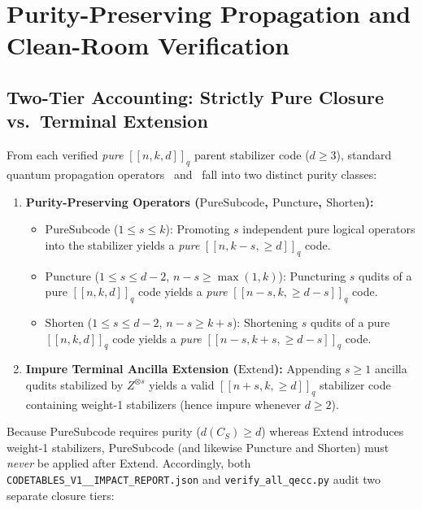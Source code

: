 \documentclass[11pt,a4paper]{article}
\theoremstyle{remark}
\begin{document}
\section{Purity-Preserving Propagation and Clean-Room Verification}\label{sec:verification}

\subsection{Two-Tier Accounting: Strictly Pure Closure vs.\ Terminal Extension}

From each verified \emph{pure} $[[n, k, d]]_q$ parent stabilizer code ($d \ge 3$), standard quantum propagation operators~\cite[Theorem~6]{Calderbank1998} and~\cite[Lemmas~69--72]{Ketkar2006} fall into two distinct purity classes:
\begin{enumerate}\small
  \item \textbf{Purity-Preserving Operators ($\mathrm{PureSubcode}$, $\mathrm{Puncture}$, $\mathrm{Shorten}$):}
  \begin{itemize}
    \item $\mathrm{PureSubcode}$ ($1 \le s \le k$): Promoting $s$ independent pure logical operators into the stabilizer yields a \emph{pure} $[[n, k - s, \ge d]]_q$ code.
    \item $\mathrm{Puncture}$ ($1 \le s \le d - 2$, $n - s \ge \max(1, k)$): Puncturing $s$ qudits of a pure $[[n, k, d]]_q$ code yields a \emph{pure} $[[n - s, k, \ge d - s]]_q$ code.
    \item $\mathrm{Shorten}$ ($1 \le s \le d - 2$, $n - s \ge k + s$): Shortening $s$ qudits of a pure $[[n, k, d]]_q$ code yields a \emph{pure} $[[n - s, k + s, \ge d - s]]_q$ code.
  \end{itemize}
  \item \textbf{Impure Terminal Ancilla Extension ($\mathrm{Extend}$):} Appending $s \ge 1$ ancilla qudits stabilized by $Z^{\otimes s}$ yields a valid $[[n + s, k, \ge d]]_q$ stabilizer code containing weight-1 stabilizers (hence impure whenever $d \ge 2$).
\end{enumerate}
Because PureSubcode requires purity ($d(C_S) \ge d$) whereas Extend introduces weight-1 stabilizers, PureSubcode (and likewise Puncture and Shorten) must \emph{never} be applied after Extend. Accordingly, both \texttt{CODETABLES\_\allowbreak V1\_\_\allowbreak IMPACT\_\allowbreak REPORT.json} and \texttt{verify\_all\_qecc.py} audit two separate closure tiers:
\end{document}
